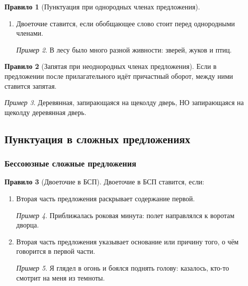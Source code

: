 \documentclass[12pt]{article}
\theoremstyle{definition}
\newtheorem{rrule}{Правило}[section]
\theoremstyle{remark}
\newtheorem*{example}{Пример}
\begin{document}
\begin{rrule}[Пунктуация при однородных членах предложения]
\begin{enumerate}
\begin{enumerate}
            \begin{example}
                Одежда, обувь, документы — всё необходимое уже лежит в чемодане. Везде: в гостинной, на кухне, в ванной — лежали ее вещи.
            \end{example}
            \item Двоеточие ставится, если обобщающее слово стоит перед однородными членами.
            \begin{example}
                В лесу было много разной живности: зверей, жуков и птиц.
            \end{example}
        \end{enumerate}
    \end{enumerate}
\end{rrule}

\begin{rrule}[Запятая при неоднородных членах предложения]
    Если в предложении после прилагательного идёт причастный оборот, между ними ставится запятая.
    \begin{example}
        Деревянная, запирающаяся на щеколду дверь, НО запирающаяся на щеколду деревянная дверь.
    \end{example}
\end{rrule}

\subsection{Пунктуация в сложных предложениях}

\subsubsection{Бессоюзные сложные предложения}

\begin{rrule}[Двоеточие в БСП]
    Двоеточие в БСП ставится, если:
    \begin{enumerate}
        \item Вторая часть предложения раскрывает содержание первой.
        \begin{example}
            Приближалась роковая минута: полет направлялся к воротам дворца.
        \end{example}
        \item Вторая часть предложения указывает основание или причину того, о чём говорится в первой части.
        \begin{example}
            Я глядел в огонь и боялся поднять голову: казалось, кто-то смотрит на меня из темноты.
        \end{example}
    \end{enumerate}
\end{rrule}
\end{document}
